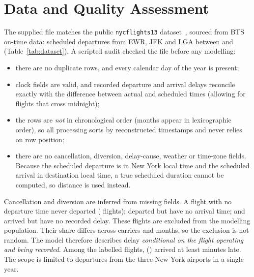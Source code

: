 \documentclass[conference]{IEEEtran}
\begin{document}
\section{Data and Quality Assessment}\label{sec:data}
The supplied file matches the public \texttt{nycflights13} dataset~\cite{nycflights13}, sourced
from BTS on-time data: \DataRows{} scheduled departures from EWR, JFK and LGA between \DataStart{}
and \DataEnd{} (Table~\ref{tab:dataset}).
A scripted audit checked the file before any modelling:
\begin{itemize}
\item there are no duplicate rows, and every calendar day of the year is present;
\item clock fields are valid, and recorded departure and arrival delays reconcile exactly with the
difference between actual and scheduled times (allowing for flights that cross midnight);
\item the rows are \emph{not} in chronological order (months appear in lexicographic order), so
all processing sorts by reconstructed timestamps and never relies on row position;
\item there are no cancellation, diversion, delay-cause, weather or time-zone fields. Because the
scheduled departure is in New York local time and the scheduled arrival in destination local time,
a true scheduled duration cannot be computed, so distance is used instead.
\end{itemize}
Cancellation and diversion are inferred from missing fields. A flight with no departure time never
departed (\DataNoDep{} flights); \DataDepNoArr{} departed but have no arrival time; and
\DataArrNoDelay{} arrived but have no recorded delay. These \DataUnlabelled{} flights are excluded
from the modelling population. Their share differs across carriers and months, so the exclusion is
not random. The model therefore describes delay \emph{conditional on the flight operating and being
recorded}. Among the \DataLabelled{} labelled flights, \DataPositives{} (\DataPrevalence) arrived at
least \TargetMinutes{} minutes late. The scope is limited to departures from the three New York
airports in a single year.


\end{document}
